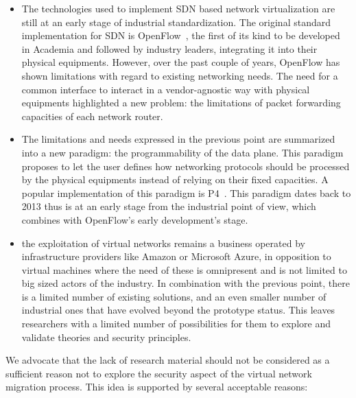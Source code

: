 \begin{itemize}
    \item The technologies used to implement SDN based network virtualization are still at an early stage of industrial standardization. The original standard implementation for SDN is OpenFlow~\cite{Openflow-McKeown2008}, the first of its kind to be developed in Academia and followed by industry leaders, integrating it into their physical equipments. However, over the past couple of years, OpenFlow has shown limitations with regard to existing networking needs. The need for a common interface to interact in a vendor-agnostic way with physical equipments highlighted a new problem: the limitations of packet forwarding capacities of each network router. 
    
    \item The limitations and needs expressed in the previous point are summarized into a new paradigm: the programmability of the data plane.
    This paradigm proposes to let the user defines how networking protocols should be processed by the physical equipments instead of relying on their fixed capacities. A popular implementation of this paradigm is P4~\cite{P4}.
    This paradigm dates back to 2013 thus is at an early stage from the industrial point of view, which combines with OpenFlow's early development's stage.
    
    \item the exploitation of virtual networks remains a business operated by infrastructure providers like Amazon or Microsoft Azure, in opposition to virtual machines where the need of these is omnipresent and is not limited to big sized actors of the industry. In combination with the previous point, there is a limited number of existing solutions, and an even smaller number of industrial ones that have evolved beyond the prototype status. This leaves researchers with a limited number of possibilities for them to explore and validate theories and security principles.
\end{itemize}

We advocate that the lack of research material should not be considered as a sufficient reason not to explore the security aspect of the virtual network migration process. This idea is supported by several acceptable reasons:

